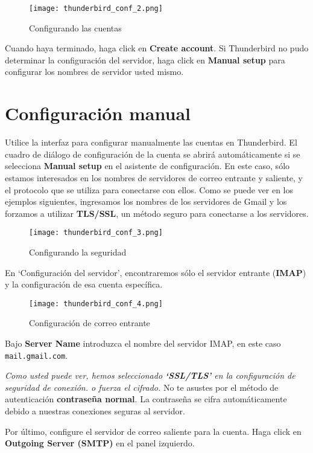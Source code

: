 \documentclass[10pt,a5paper,twoside,,]{book}
\begin{document}
\begin{figure}[htbp]
\centering
\texttt{[image: thunderbird\_conf\_2.png]}
\caption{Configurando las cuentas}
\end{figure}

Cuando haya terminado, haga click en \textbf{Create account}. Si
Thunderbird no pudo determinar la configuración del servidor, haga click
en \textbf{Manual setup} para configurar los nombres de servidor usted
mismo.

\section{Configuración manual}\label{configuraciuxf3n-manual}

Utilice la interfaz para configurar manualmente las cuentas en
Thunderbird. El cuadro de diálogo de configuración de la cuenta se
abrirá automáticamente si se selecciona \textbf{Manual setup} en el
asistente de configuración. En este caso, sólo estamos interesados en
los nombres de servidores de correo entrante y saliente, y el protocolo
que se utiliza para conectarse con ellos. Como se puede ver en los
ejemplos siguientes, ingresamos los nombres de los servidores de Gmail y
los forzamos a utilizar \textbf{TLS/SSL}, un método seguro para
conectarse a los servidores.

\begin{figure}[htbp]
\centering
\texttt{[image: thunderbird\_conf\_3.png]}
\caption{Configurando la seguridad}
\end{figure}

En `Configuración del servidor', encontraremos sólo el servidor entrante
(\textbf{IMAP}) y la configuración de esa cuenta específica.

\begin{figure}[htbp]
\centering
\texttt{[image: thunderbird\_conf\_4.png]}
\caption{Configuración de correo entrante}
\end{figure}

Bajo \textbf{Server Name} introduzca el nombre del servidor IMAP, en
este caso \texttt{mail.gmail.com}.

\emph{Como usted puede ver, hemos seleccionado \textbf{`SSL/TLS'} en la
configuración de seguridad de conexión. o fuerza el cifrado.} No te
asustes por el método de autenticación \textbf{contraseña normal}. La
contraseña se cifra automáticamente debido a nuestras conexiones seguras
al servidor.

Por último, configure el servidor de correo saliente para la cuenta.
Haga click en \textbf{Outgoing Server (SMTP)} en el panel izquierdo.
\end{document}
